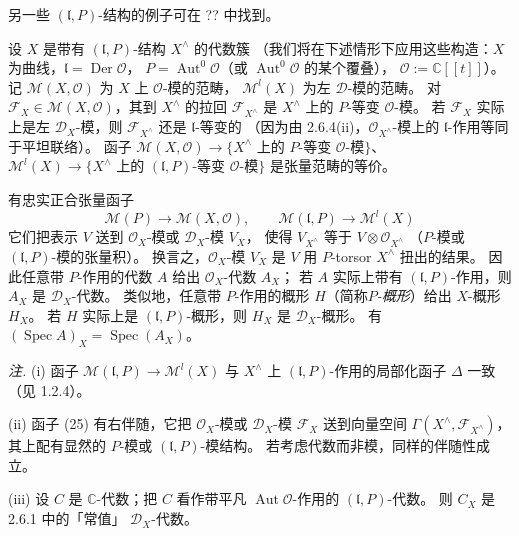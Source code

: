另一些 $(\mathfrak{l},P)$-结构的例子可在 ?? 中找到。

 设 $X$ 是带有 $(\mathfrak{l},P)$-结构 $X^{\wedge}$ 的代数簇
（我们将在下述情形下应用这些构造：$X$ 为曲线，$\mathfrak{l}=\operatorname{Der}\mathcal{O}$，
$P=\operatorname{Aut}^0\mathcal{O}$（或 $\operatorname{Aut}^0\mathcal{O}$ 的某个覆叠），
$\mathcal{O}:=\mathbb{C}[[t]]$）。
记 $\mathcal{M}(X,\mathcal{O})$ 为 $X$ 上 $\mathcal{O}$-模的范畴，
$\mathcal{M}^l(X)$ 为左 $\mathcal{D}$-模的范畴。
对 $\mathcal{F}_X\in\mathcal{M}(X,\mathcal{O})$，其到 $X^{\wedge}$ 的拉回
$\mathcal{F}_{X^{\wedge}}$ 是 $X^{\wedge}$ 上的 $P$-等变 $\mathcal{O}$-模。
若 $\mathcal{F}_X$ 实际上是左 $\mathcal{D}_X$-模，则 $\mathcal{F}_{X^{\wedge}}$ 还是 $\mathfrak{l}$-等变的
（因为由 2.6.4(ii)，$\mathcal{O}_{X^{\wedge}}$-模上的 $\mathfrak{l}$-作用等同于平坦联络）。
函子
$\mathcal{M}(X,\mathcal{O})\to\{X^{\wedge}\text{ 上的 }P\text{-等变 }\mathcal{O}\text{-模}\}$、
$\mathcal{M}^l(X)\to\{X^{\wedge}\text{ 上的 }(\mathfrak{l},P)\text{-等变 }\mathcal{O}\text{-模}\}$
是张量范畴的等价。

有忠实正合张量函子
\begin{equation}\tag{25}
\mathcal{M}(P)\longrightarrow\mathcal{M}(X,\mathcal{O}),\qquad
\mathcal{M}(\mathfrak{l},P)\longrightarrow\mathcal{M}^l(X)
\end{equation}
它们把表示 $V$ 送到 $\mathcal{O}_X$-模或 $\mathcal{D}_X$-模 $V_X$，
使得 $V_{X^{\wedge}}$ 等于 $V\otimes\mathcal{O}_{X^{\wedge}}$
（$P$-模或 $(\mathfrak{l},P)$-模的张量积）。
换言之，$\mathcal{O}_X$-模 $V_X$ 是 $V$ 用 $P$-torsor $X^{\wedge}$ 扭出的结果。
因此任意带 $P$-作用的代数 $A$ 给出 $\mathcal{O}_X$-代数 $A_X$；
若 $A$ 实际上带有 $(\mathfrak{l},P)$-作用，则 $A_X$ 是 $\mathcal{D}_X$-代数。
类似地，任意带 $P$-作用的概形 $H$（简称\emph{$P$-概形}）给出 $X$-概形 $H_X$。
若 $H$ 实际上是 $(\mathfrak{l},P)$-概形，则 $H_X$ 是 $\mathcal{D}_X$-概形。
有 $(\operatorname{Spec} A)_X=\operatorname{Spec}(A_X)$。

\emph{注.} (i) 函子 $\mathcal{M}(\mathfrak{l},P)\longrightarrow\mathcal{M}^l(X)$
与 $X^{\wedge}$ 上 $(\mathfrak{l},P)$-作用的局部化函子 $\Delta$ 一致（见 1.2.4）。

(ii) 函子 (25) 有右伴随，它把 $\mathcal{O}_X$-模或 $\mathcal{D}_X$-模 $\mathcal{F}_X$ 送到向量空间
$\Gamma(X^{\wedge},\mathcal{F}_{X^{\wedge}})$，其上配有显然的 $P$-模或 $(\mathfrak{l},P)$-模结构。
若考虑代数而非模，同样的伴随性成立。

(iii) 设 $C$ 是 $\mathbb{C}$-代数；把 $C$ 看作带平凡 $\operatorname{Aut}\mathcal{O}$-作用的 $(\mathfrak{l},P)$-代数。
则 $C_X$ 是 2.6.1 中的「常值」 $\mathcal{D}_X$-代数。

